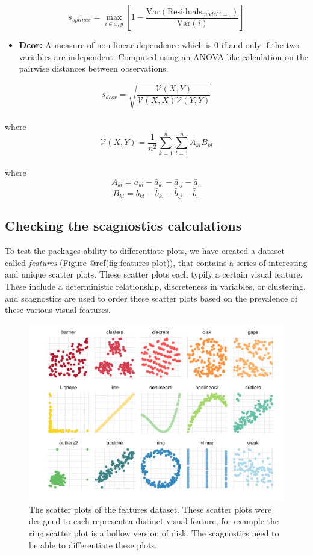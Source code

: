 \[s_{splines}=\max_{i\in x,y}\left[ 1-\frac{\mbox{Var}(\mbox{Residuals}_{model~i=.})}{\mbox{Var}(i)}\right] \]

\begin{itemize}
\tightlist
\item
  \textbf{Dcor:} A measure of non-linear dependence which is 0 if and
  only if the two variables are independent. Computed using an ANOVA
  like calculation on the pairwise distances between observations.
\end{itemize}

\[s_{dcor}= \sqrt{\frac{\mathcal{V}(X,Y)}{\mathcal{V}(X,X)\mathcal{V}(Y,Y)}}\]\\
where \[\mathcal{V}
(X,Y)=\frac{1}{n^2}\sum_{k=1}^n\sum_{l=1}^nA_{kl}B_{kl}\]\\
where \[A_{kl}=a_{kl}-\bar{a}_{k.}-\bar{a}_{.j}-\bar{a}_{..}\]
\[B_{kl}=b_{kl}-\bar{b}_{k.}-\bar{b}_{.j}-\bar{b}_{..}\]

\hypertarget{checking-the-scagnostics-calculations}{%
\subsection{Checking the scagnostics
calculations}\label{checking-the-scagnostics-calculations}}

To test the packages ability to differentiate plots, we have created a
dataset called \emph{features} (Figure @ref(fig:features-plot)), that
contains a series of interesting and unique scatter plots. These scatter
plots each typify a certain visual feature. These include a
deterministic relationship, discreteness in variables, or clustering,
and scagnostics are used to order these scatter plots based on the
prevalence of these various visual features.

\begin{Schunk}
\begin{figure}
\includegraphics[width=1\linewidth]{mason-lee-laa-cook_files/figure-latex/features-plot-1} \caption[The scatter plots of the features dataset]{The scatter plots of the features dataset. These scatter plots were designed to each represent a distinct visual feature, for example the ring scatter plot is a hollow version of disk. The scagnostics need to be able to differentiate these plots.}\label{fig:features-plot}
\end{figure}
\end{Schunk}


